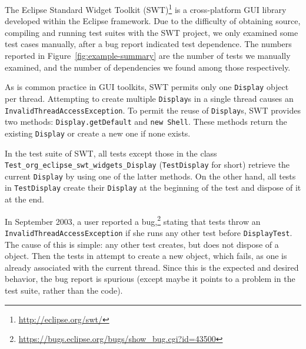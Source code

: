 \newcommand{\ite}{\texttt{Invalid\-Thread\-Access\-Exception}}

The Eclipse Standard Widget Toolkit
(SWT)\footnote{\url{http://eclipse.org/swt/}} is a cross-platform GUI
library developed within the Eclipse framework.
%
Due to the difficulty of obtaining source, compiling and running
test suites with the SWT project, we only examined some test cases
manually, after a bug report indicated test dependence. The
numbers reported in Figure~\ref{fig:example-summary} are the number
of tests we manually examined, and the number of dependencies we found
among those respectively.

As is common practice in GUI toolkits, SWT permits only one
\texttt{Display} object per thread. Attempting to create multiple
\texttt{Display}s in a single thread causes an \ite{}. 
To permit the reuse of \texttt{Display}s, SWT provides two 
methods: \texttt{Display.getDefault} and \texttt{new Shell}. These
methods return the existing \texttt{Display} or create a new one if none exists.


In the test suite of SWT, all tests except those in the class \texttt{Test\_org\_eclipse\_swt\_widgets\_Display}
(\texttt{TestDisplay} for short) retrieve the current \texttt{Display} by using
one of the latter methods. On the other hand, all tests in
\texttt{TestDisplay} create their \texttt{Display} at the beginning of the test
and dispose of it at the end. 



In September 2003, a user reported a
bug,\footnote{\url{https://bugs.eclipse.org/bugs/show_bug.cgi?id=43500}}
stating that tests throw an \ite{}
if she runs any other test before \texttt{DisplayTest}. 
The cause of this is simple: any other test creates, but does not
dispose of a  object. Then the tests in
 attempt to create a new object, which fails, as one
is already associated with the current thread.
Since this is the expected and desired behavior, the bug report is
spurious (except maybe it points to a problem in the test suite,
rather than the code).


